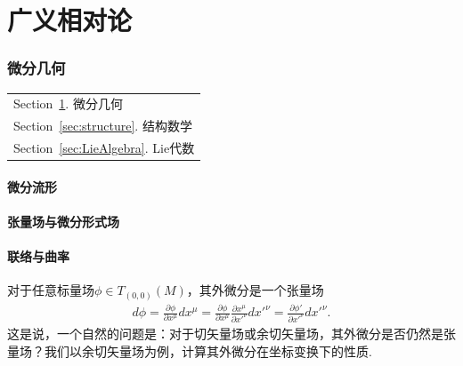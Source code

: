 \documentclass[10pt]{article}
\begin{document}
	\part{广义相对论}\label{Part:GR}
\section{微分几何}\label{sec:DG}
	\begin{margintable}\vspace{1.4in}\footnotesize
		\begin{tabularx}{\marginparwidth}{|X}
		Section~\ref{sec:DG}. 微分几何\\
		Section~\ref{sec:structure}. 结构数学\\
		Section~\ref{sec:LieAlgebra}. Lie代数\\
		\end{tabularx}
	\end{margintable}
\subsection{微分流形}


\subsection{张量场与微分形式场}


\subsection{联络与曲率}
	对于任意标量场$\phi\in T_{(0,0)}(M)$，其外微分是一个张量场
	\begin{equation}
		\begin{split}
	 		d\phi=\frac{\partial\phi}{\partial x^\mu}dx^\mu=\frac{\partial\phi}{\partial {x}^\mu}\frac{\partial{x}^\mu}{\partial {x'}^\nu}d{x'}^\nu=\frac{\partial{\phi'}}{\partial {x'}^\nu}d{x'}^\nu.
		\end{split}
	\end{equation}
	这是说，一个自然的问题是：对于切矢量场或余切矢量场，其外微分是否仍然是张量场？我们以余切矢量场为例，计算其外微分在坐标变换下的性质.
	
\end{document}
